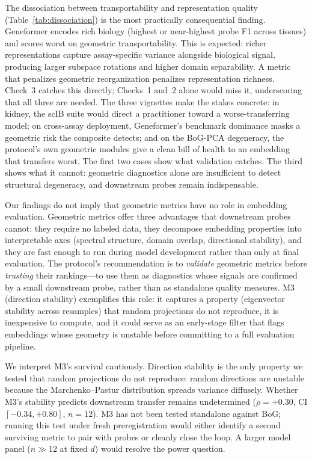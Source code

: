 \documentclass[10pt,letterpaper]{article}
\begin{document}
The dissociation between transportability and representation quality (Table~\ref{tab:dissociation}) is the most practically consequential finding. Geneformer encodes rich biology (highest or near-highest probe F1 across tissues) and scores worst on geometric transportability. This is expected: richer representations capture assay-specific variance alongside biological signal, producing larger subspace rotations and higher domain separability. A metric that penalizes geometric reorganization penalizes representation richness. Check~3 catches this directly; Checks~1 and~2 alone would miss it, underscoring that all three are needed. The three vignettes make the stakes concrete: in kidney, the scIB suite would direct a practitioner toward a worse-transferring model; on cross-assay deployment, Geneformer's benchmark dominance masks a geometric risk the composite detects; and on the BoG-PCA degeneracy, the protocol's own geometric modules give a clean bill of health to an embedding that transfers worst. The first two cases show what validation catches. The third shows what it cannot: geometric diagnostics alone are insufficient to detect structural degeneracy, and downstream probes remain indispensable.

Our findings do not imply that geometric metrics have no role in embedding evaluation. Geometric metrics offer three advantages that downstream probes cannot: they require no labeled data, they decompose embedding properties into interpretable axes (spectral structure, domain overlap, directional stability), and they are fast enough to run during model development rather than only at final evaluation. The protocol's recommendation is to \emph{validate} geometric metrics before \emph{trusting} their rankings---to use them as diagnostics whose signals are confirmed by a small downstream probe, rather than as standalone quality measures. M3 (direction stability) exemplifies this role: it captures a property (eigenvector stability across resamples) that random projections do not reproduce, it is inexpensive to compute, and it could serve as an early-stage filter that flags embeddings whose geometry is unstable before committing to a full evaluation pipeline.

We interpret M3's survival cautiously. Direction stability is the only property we tested that random projections do not reproduce: random directions are unstable because the Marchenko--Pastur distribution spreads variance diffusely. Whether M3's stability predicts downstream transfer remains undetermined ($\rho = +0.30$, CI $[-0.34, +0.80]$, $n = 12$). M3 has not been tested standalone against BoG; running this test under fresh preregistration would either identify a second surviving metric to pair with probes or cleanly close the loop. A larger model panel ($n \gg 12$ at fixed $d$) would resolve the power question.
\end{document}
